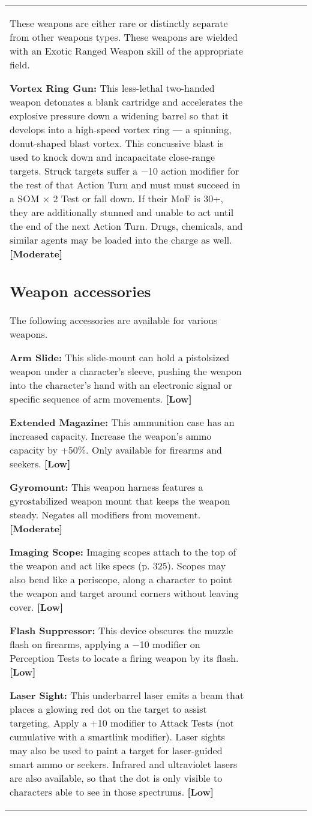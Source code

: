 \begin{tabular}{|l|l|l|l|l|l|l|}
These weapons are either rare or distinctly separate from other weapons types. These weapons are wielded with an Exotic Ranged Weapon skill of the appropriate field. 

\textbf{Vortex Ring Gun:} This less-lethal two-handed weapon detonates a blank cartridge and accelerates the explosive pressure down a widening barrel so that it develops into a high-speed vortex ring --- a spinning, donut-shaped blast vortex. This concussive blast is used to knock down and incapacitate close-range targets. Struck targets suffer a $-$10 action modifier for the rest of that Action Turn and must must succeed in a SOM $\times$ 2 Test or fall down. If their MoF is 30+, they are additionally stunned and unable to act until the end of the next Action Turn. Drugs, chemicals, and similar agents may be loaded into the charge as well. \textbf{[Moderate]} 

\subsection{Weapon accessories} \label{sec:weapon-accessories} 

The following accessories are available for various weapons. 

\textbf{Arm Slide:} This slide-mount can hold a pistolsized weapon under a character’s sleeve, pushing the weapon into the character’s hand with an electronic signal or specific sequence of arm movements. \textbf{[Low]} 

\textbf{Extended Magazine:} This ammunition case has an increased capacity. Increase the weapon’s ammo capacity by +50\%. Only available for firearms and seekers. \textbf{[Low]} 

\textbf{Gyromount:} This weapon harness features a gyrostabilized weapon mount that keeps the weapon steady. Negates all modifiers from movement. \textbf{[Moderate]} 

\textbf{Imaging Scope:} Imaging scopes attach to the top of the weapon and act like specs (p. 325). Scopes may also bend like a periscope, along a character to point the weapon and target around corners without leaving cover. \textbf{[Low]} 

\textbf{Flash Suppressor:} This device obscures the muzzle flash on firearms, applying a $-$10 modifier on Perception Tests to locate a firing weapon by its flash. \textbf{[Low]} 

\textbf{Laser Sight:} This underbarrel laser emits a beam that places a glowing red dot on the target to assist targeting. Apply a +10 modifier to Attack Tests (not cumulative with a smartlink modifier). Laser sights may also be used to paint a target for laser-guided smart ammo or seekers. Infrared and ultraviolet lasers are also available, so that the dot is only visible to characters able to see in those spectrums. \textbf{[Low]} 


\end{tabular}
